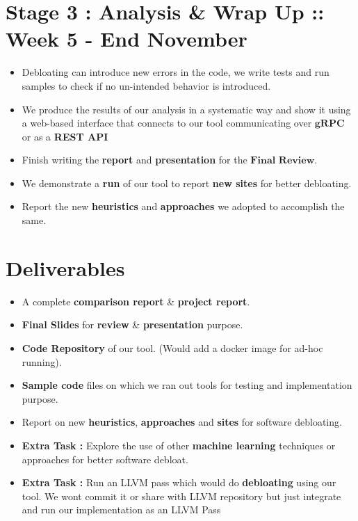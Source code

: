 \documentclass{article} %
\begin{document}
\section*{Stage 3 : Analysis \& Wrap Up :: Week 5 - End November}
\begin{itemize}
	\item Debloating can introduce new errors in the code, we write tests and run samples to check if no un-intended behavior is introduced.  
    \item We produce the results of our analysis in a systematic way and show it using a web-based interface that connects to our tool communicating over $\textbf{gRPC}$ or as a \textbf{REST API}
    \item Finish writing the \textbf{report} and \textbf{presentation} for the $\textbf{Final Review}$. 
    \item We demonstrate a \textbf{run} of our tool to report \textbf{new sites} for better debloating. 
    \item Report the new \textbf{heuristics} and \textbf{approaches} we adopted to accomplish the same. 
\end{itemize}

\section*{Deliverables} 
    \begin{itemize}
        \item A complete \textbf{comparison report} \& \textbf{project report}.
        \item \textbf{Final Slides} for \textbf{review} \& \textbf{presentation} purpose.
        \item \textbf{Code Repository} of our tool. (Would add a docker image for ad-hoc running).
        \item \textbf{Sample code} files on which we ran out tools for testing and implementation purpose.  
        \item Report on new \textbf{heuristics}, \textbf{approaches} and \textbf{sites} for software debloating.  
        \item \textbf{Extra Task :} Explore the use of other \textbf{machine learning} techniques or approaches for better software debloat.
        \item \textbf{Extra Task :} Run an LLVM pass which would do \textbf{debloating} using our tool. \color{blue} We wont commit it or share with LLVM repository but just integrate and run our implementation as an LLVM Pass \color{black}  
    \end{itemize}
\end{document}
